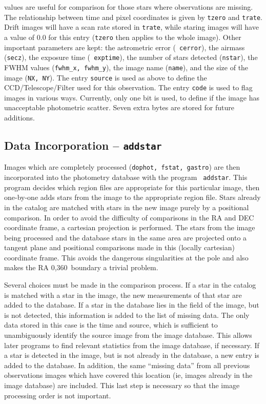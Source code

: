 \documentclass{article}
\begin{document}
values are useful for comparison for those stars where observations
are missing.  The relationship between time and pixel coordinates is
given by {\tt tzero} and {\tt trate}.  Drift images will have a scan
rate stored in {\tt trate}, while staring images will have a value of
0.0 for this entry ({\tt tzero} then applies to the whole image).
Other important parameters are kept: the astrometric error ({\tt
  cerror}), the airmass ({\tt secz}), the exposure time ({\tt
  exptime}), the number of stars detected ({\tt nstar}), the FWHM
values ({\tt fwhm\_x, fwhm\_y}), the image name ({\tt name}), and the
size of the image ({\tt NX, NY}).  The entry {\tt source} is used as
above to define the CCD/Telescope/Filter used for this observation.
The entry {\tt code} is used to flag images in various ways.
Currently, only one bit is used, to define if the image has
unacceptable photometric scatter.  Seven extra bytes are stored for
future additions.

\subsection{Data Incorporation -- {\tt addstar}}

Images which are completely processed ({\tt dophot, fstat, gastro}) are
then incorporated into the photometry database with the program {\tt 
addstar}.  This program decides which region files are appropriate
for this particular image, then one-by-one adds stars from the image
to the appropriate region file.  Stars already in the catalog are
matched with stars in the new image purely by a positional comparison.
In order to avoid the difficulty of comparisons in the RA and DEC
coordinate frame, a cartesian projection is performed.  The stars from
the image being processed and the database stars in the same area are
projected onto a tangent plane and positional comparisons made in this
(locally cartesian) coordinate frame.  This avoids the dangerous
singularities at the pole and also makes the RA 0,360\degree\ boundary
a trivial problem.  

Several choices must be made in the comparison process.  If a star in
the catalog is matched with a star in the image, the new measurements
of that star are added to the database.  If a star in the database
lies in the field of the image, but is not detected, this information
is added to the list of missing data.  The only data stored in this
case is the time and source, which is sufficient to unambiguously
identify the source image from the image database.  This allows later
programs to find relevant statistics from the image database, if
necessary.  If a star is detected in the image, but is not already in
the database, a new entry is added to the database.  In addition, the
same ``missing data'' from all previous observations images which have
covered this location (ie, images already in the image database) are
included.  This last step is necessary so that the image processing
order is not important.  
\end{document}
